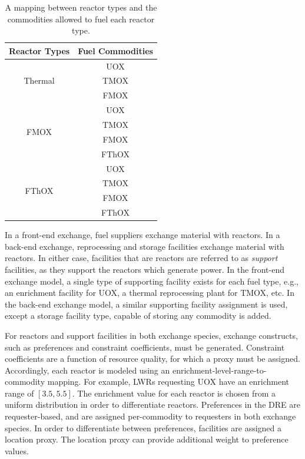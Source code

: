 \documentclass{anstrans}
\begin{document}
\begin{table}[]
\centering
\caption{A mapping between reactor types and the commodities allowed to fuel 
  each reactor type.}
\label{tbl:rx_to_commods}
\begin{tabular}{|c|c|}
\hline
\textbf{Reactor Types}            & \textbf{Fuel Commodities} \\ \hline
\multirow{3}{*}{Thermal}                    & UOX         \\ 
                      & TMOX        \\  
                      & FMOX       \\ \hline
\multirow{4}{*}{FMOX}  & UOX         \\  
                      & TMOX        \\ 
                      & FMOX        \\  
                      & FThOX        \\ \hline 
\multirow{4}{*}{FThOX} & UOX         \\  
                     & TMOX        \\ 
                      & FMOX        \\  
                      & FThOX        \\ \hline 
\end{tabular}
\end{table}

In a front-end exchange, fuel suppliers exchange material with reactors. In a
back-end exchange, reprocessing and storage facilities exchange material with
reactors. In either case, facilities that are  reactors are referred
to as \textit{support} facilities, as they support the reactors which generate
power. In the front-end exchange model, a single type of supporting facility
exists for each fuel type, e.g., an enrichment facility for UOX, a thermal
reprocessing plant for TMOX, etc. In the back-end exchange model, a similar
supporting facility assignment is used, except a storage facility type, capable
of storing any commodity is added.

For reactors and support facilities in both exchange species, exchange
constructs, such as preferences and constraint coefficients, must be
generated. Constraint coefficients are a function of resource quality, for which
a proxy must be assigned. Accordingly, each reactor is modeled using an
enrichment-level-range-to-commodity mapping. For example, LWRs requesting UOX
have an enrichment range of $[3.5, 5.5]$. The enrichment value for each reactor
is chosen from a uniform distribution in order to differentiate
reactors. Preferences in the DRE are requester-based, and are assigned
per-commodity to requesters in both exchange species. In order to differentiate
between preferences, facilities are assigned a location proxy. The location
proxy can provide additional weight to preference values.
\end{document}
